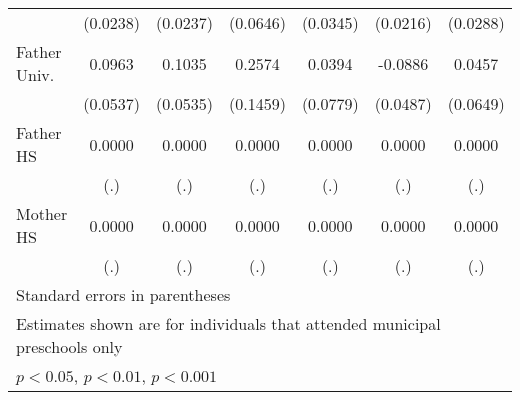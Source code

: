 \begin{table}[htbp]
\begin{tabular}{l*{6}{c}}
            &    (0.0238)         &    (0.0237)         &    (0.0646)         &    (0.0345)         &    (0.0216)         &    (0.0288)         \\
\addlinespace
Father Univ.&      0.0963         &      0.1035         &      0.2574         &      0.0394         &     -0.0886         &      0.0457         \\
            &    (0.0537)         &    (0.0535)         &    (0.1459)         &    (0.0779)         &    (0.0487)         &    (0.0649)         \\
\addlinespace
Father HS   &      0.0000         &      0.0000         &      0.0000         &      0.0000         &      0.0000         &      0.0000         \\
            &         (.)         &         (.)         &         (.)         &         (.)         &         (.)         &         (.)         \\
\addlinespace
Mother HS   &      0.0000         &      0.0000         &      0.0000         &      0.0000         &      0.0000         &      0.0000         \\
            &         (.)         &         (.)         &         (.)         &         (.)         &         (.)         &         (.)         \\
\bottomrule
\multicolumn{7}{l}{\footnotesize Standard errors in parentheses}\\
\multicolumn{7}{l}{\footnotesize Estimates shown are for individuals that attended municipal preschools only}\\
\multicolumn{7}{l}{\footnotesize \sym{*} \(p<0.05\), \sym{**} \(p<0.01\), \sym{***} \(p<0.001\)}\\
\end{tabular}
\end{table}
